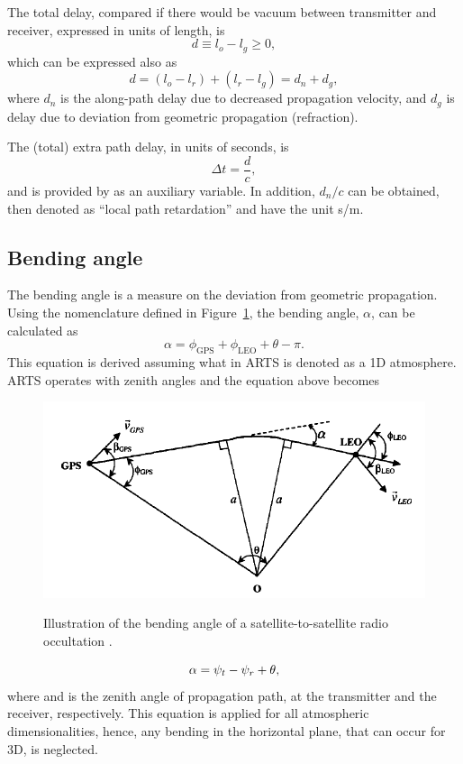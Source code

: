 The total delay, compared if there would be vacuum between transmitter and
receiver, expressed in units of length, is
\begin{equation}
d \equiv l_o-l_g \ge 0,
\end{equation}
which can be expressed also as
\begin{equation} 
d = (l_o-l_r) + (l_r-l_g) = d_{n}+d_{g},
\end{equation}
where $d_{n}$ is the along-path delay due to decreased propagation velocity,
and $d_{g}$ is delay due to deviation from geometric propagation (refraction).

The (total) extra path delay, in units of seconds, is
\begin{equation} 
\Delta t = \frac{d}{c},
\end{equation}
and is provided by  as an auxiliary variable. In
addition, $d_n/c$ can be obtained, then denoted as ``local path retardation''
and have the unit s/m.


\subsection{Bending angle}
%
The bending angle is a measure on the deviation from geometric propagation.
Using the nomenclature defined in Figure~\ref{fig:rlink:bangle}, the bending
angle, $\alpha$, can be calculated as \citep[e.g.][Eq.~6]{schreiner:99}
\begin{displaymath}
  \alpha = \phi_{\mathrm{GPS}} + \phi_{\mathrm{LEO}} + \theta - \pi.
\end{displaymath}
This equation is derived assuming what in ARTS is denoted as a 1D atmosphere.
ARTS operates with zenith angles and the equation above becomes
\begin{figure}[!tb]
 \begin{center}
  \includegraphics*[width=0.7\hsize]{bangle.png}\\
  \caption{Illustration of the bending angle of a satellite-to-satellite radio
    occultation \citep[copied from][Fig.~2]{schreiner:99}.}
 \end{center}
 \label{fig:rlink:bangle}
\end{figure}
\begin{equation} 
  \alpha = \psi_{t} - \psi_{r} + \theta,
  \label{eq:rlink:bangle}
\end{equation}
where  and  is the zenith angle of propagation path, at
the transmitter and the receiver, respectively. This equation is applied for
all atmospheric dimensionalities, hence, any bending in the horizontal plane,
that can occur for 3D, is neglected.

